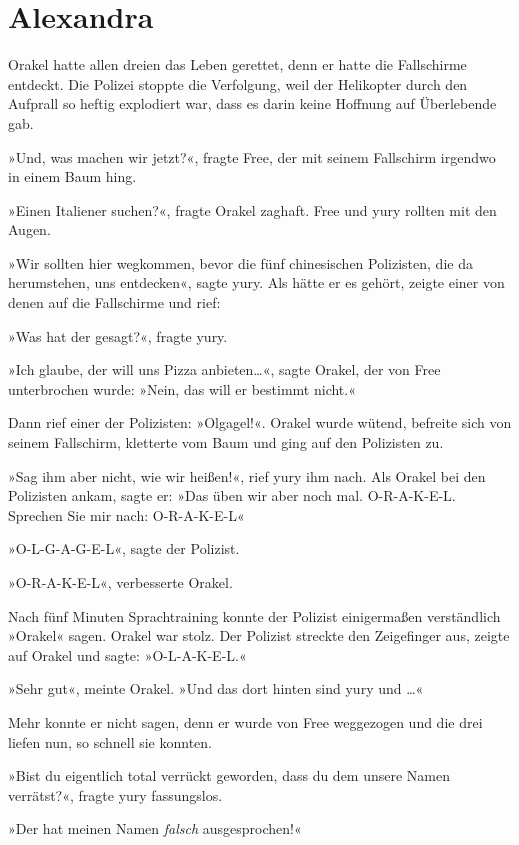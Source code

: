 \chapter{Alexandra}

Orakel hatte allen dreien das Leben gerettet, denn er hatte die Fallschirme entdeckt. Die Polizei stoppte die Verfolgung, weil der Helikopter durch den Aufprall so heftig explodiert war, dass es darin keine Hoffnung auf Überlebende gab.

»Und, was machen wir jetzt?«, fragte Free, der mit seinem Fallschirm irgendwo in einem Baum hing.

»Einen Italiener suchen?«, fragte Orakel zaghaft. Free und yury rollten mit den Augen.

»Wir sollten hier wegkommen, bevor die fünf chinesischen Polizisten, die da herumstehen, uns entdecken«, sagte yury. Als hätte er es gehört, zeigte einer von denen auf die Fallschirme und rief:


»Was hat der gesagt?«, fragte yury.

»Ich glaube, der will uns Pizza anbieten…«, sagte Orakel, der von Free unterbrochen wurde: »Nein, das will er bestimmt nicht.«

Dann rief einer der Polizisten: »Olgagel!«. Orakel wurde wütend, befreite sich von seinem Fallschirm, kletterte vom Baum und ging auf den Polizisten zu.

»Sag ihm aber nicht, wie wir heißen!«, rief yury ihm nach. Als Orakel bei den Polizisten ankam, sagte er: »Das üben wir aber noch mal. O-R-A-K-E-L. Sprechen Sie mir nach: O-R-A-K-E-L«

»O-L-G-A-G-E-L«, sagte der Polizist.

»O-R-A-K-E-L«, verbesserte Orakel.

Nach fünf Minuten Sprachtraining konnte der Polizist einigermaßen verständlich »Orakel« sagen. Orakel war stolz. Der Polizist streckte den Zeigefinger aus, zeigte auf Orakel und sagte: »O-L-A-K-E-L.«

»Sehr gut«, meinte Orakel. »Und das dort hinten sind yury und …«

Mehr konnte er nicht sagen, denn er wurde von Free weggezogen und die drei liefen nun, so schnell sie konnten.

»Bist du eigentlich total verrückt geworden, dass du dem unsere Namen verrätst?«, fragte yury fassungslos.

»Der hat meinen Namen \emph{falsch} ausgesprochen!«


